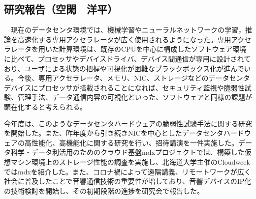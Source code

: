 \subsection{研究報告（空閑　洋平）}
　現在のデータセンタ環境では、機械学習やニューラルネットワークの学習，推論を高速化する専用アクセラレータが広く使用されるようになった。専用アクセラレータを用いた計算環境は、既存のCPUを中心に構成したソフトウェア環境に比べて、プロセッサやデバイスドライバ、デバイス間通信が専用に設計されており、ユーザによる状態の把握や可視化が困難なブラックボックス化が進んでいる。今後、専用アクセラレータ、メモリ、NIC、ストレージなどのデータセンタデバイスにプロセッサが搭載されることになれば、セキュリティ監視や脆弱性試験、管理手法、データ通信内容の可視化といった、ソフトウェアと同様の課題が顕在化すると考えられる。

今年度は、このようなデータセンタハードウェアの脆弱性試験手法に関する研究を開始した。また、昨年度から引き続きNICを中心としたデータセンタハードウェアの高性能化、高機能化に関する研究を行い\cite{ykuga33191433, ykuga32183289, ykuga36595746}、招待講演を一件実施した\cite{ykuga36619729}。データ科学・データ利活用のためのクラウド基盤mdxプロジェクトでは、構築した仮想マシン環境上のストレージ性能の調査を実施\cite{ykuga36616798}し、北海道大学主催のCloudweekではmdxを紹介した\cite{ykuga36619767}。また、コロナ禍によって遠隔講義、リモートワークが広く社会に普及したことで音響通信技術の重要性が増しており、音響デバイスのIP化の技術検討を開始し、その初期段階の進捗を研究会で報告した\cite{ykuga36616852}。